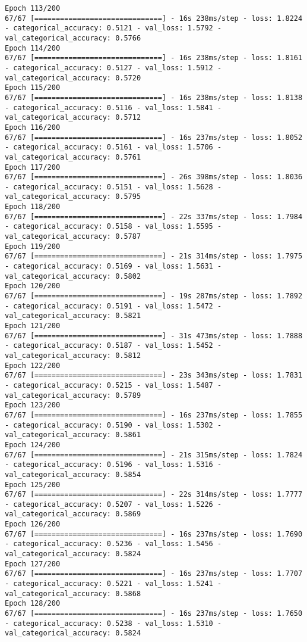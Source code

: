 \begin{lstlisting}
Epoch 113/200
67/67 [==============================] - 16s 238ms/step - loss: 1.8224 - categorical_accuracy: 0.5121 - val_loss: 1.5792 - val_categorical_accuracy: 0.5766
Epoch 114/200
67/67 [==============================] - 16s 238ms/step - loss: 1.8161 - categorical_accuracy: 0.5127 - val_loss: 1.5912 - val_categorical_accuracy: 0.5720
Epoch 115/200
67/67 [==============================] - 16s 238ms/step - loss: 1.8138 - categorical_accuracy: 0.5116 - val_loss: 1.5841 - val_categorical_accuracy: 0.5712
Epoch 116/200
67/67 [==============================] - 16s 237ms/step - loss: 1.8052 - categorical_accuracy: 0.5161 - val_loss: 1.5706 - val_categorical_accuracy: 0.5761
Epoch 117/200
67/67 [==============================] - 26s 398ms/step - loss: 1.8036 - categorical_accuracy: 0.5151 - val_loss: 1.5628 - val_categorical_accuracy: 0.5795
Epoch 118/200
67/67 [==============================] - 22s 337ms/step - loss: 1.7984 - categorical_accuracy: 0.5158 - val_loss: 1.5595 - val_categorical_accuracy: 0.5787
Epoch 119/200
67/67 [==============================] - 21s 314ms/step - loss: 1.7975 - categorical_accuracy: 0.5169 - val_loss: 1.5631 - val_categorical_accuracy: 0.5802
Epoch 120/200
67/67 [==============================] - 19s 287ms/step - loss: 1.7892 - categorical_accuracy: 0.5191 - val_loss: 1.5472 - val_categorical_accuracy: 0.5821
Epoch 121/200
67/67 [==============================] - 31s 473ms/step - loss: 1.7888 - categorical_accuracy: 0.5187 - val_loss: 1.5452 - val_categorical_accuracy: 0.5812
Epoch 122/200
67/67 [==============================] - 23s 343ms/step - loss: 1.7831 - categorical_accuracy: 0.5215 - val_loss: 1.5487 - val_categorical_accuracy: 0.5789
Epoch 123/200
67/67 [==============================] - 16s 237ms/step - loss: 1.7855 - categorical_accuracy: 0.5190 - val_loss: 1.5302 - val_categorical_accuracy: 0.5861
Epoch 124/200
67/67 [==============================] - 21s 315ms/step - loss: 1.7824 - categorical_accuracy: 0.5196 - val_loss: 1.5316 - val_categorical_accuracy: 0.5854
Epoch 125/200
67/67 [==============================] - 22s 314ms/step - loss: 1.7777 - categorical_accuracy: 0.5207 - val_loss: 1.5226 - val_categorical_accuracy: 0.5869
Epoch 126/200
67/67 [==============================] - 16s 237ms/step - loss: 1.7690 - categorical_accuracy: 0.5236 - val_loss: 1.5456 - val_categorical_accuracy: 0.5824
Epoch 127/200
67/67 [==============================] - 16s 237ms/step - loss: 1.7707 - categorical_accuracy: 0.5221 - val_loss: 1.5241 - val_categorical_accuracy: 0.5868
Epoch 128/200
67/67 [==============================] - 16s 237ms/step - loss: 1.7650 - categorical_accuracy: 0.5238 - val_loss: 1.5310 - val_categorical_accuracy: 0.5824

\end{lstlisting}
